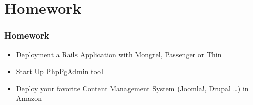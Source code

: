 \documentclass{beamer}
\begin{document}
\section{Homework}
\begin{frame}
  \frametitle{Homework}
  \begin{itemize}
    \item Deployment a Rails Application with Mongrel, Passenger or Thin
    \item Start Up PhpPgAdmin tool
    \item Deploy your favorite Content Management System (Joomla!, Drupal \dots) in Amazon
  \end{itemize}
\end{frame}
\end{document}
